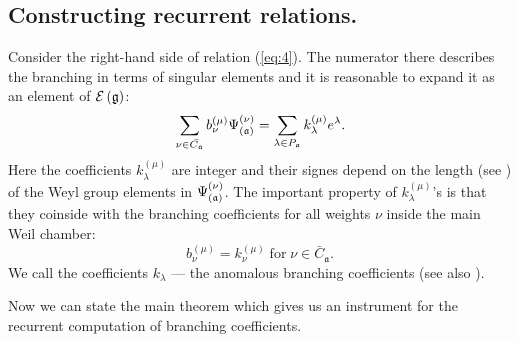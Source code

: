 \documentclass[12pt]{iopart}
\theoremstyle{definition}
\newcommand{\af}{\mathfrak{a}}
\begin{document}
\subsection{Constructing recurrent relations.}
\label{subsec:Construct-recurrent-rel}

Consider the right-hand side of relation (\ref{eq:4}).
The numerator there describes the branching in terms of singular elements and
it is reasonable to expand it as an element of $\mathcal{E}\left( \frak{g} \right)$:
\begin{equation}
  \label{eq:21}
  \sum_{\nu \in \bar{C_{\mathfrak{a}}}}b_{\nu }^{\left( \mu \right) }\Psi _{\left( \frak{%
        a}\right) }^{\left( \nu \right) }=\sum_{\lambda \in P_{\af}}k_{\lambda
  }^{\left( \mu \right) }e^{\lambda }.
\end{equation}
Here the coefficients $k_{\lambda}^{\left( \mu \right) }$ are integer and their signes
depend on the length (see \cite{humphreys1978rth})  of the Weyl group elements in
$\Psi _{\left( \frak{a}\right) }^{\left( \nu \right) }$. The important property of
$k_{\lambda}^{\left( \mu \right) }$'s is that they coinside with the branching coefficients
for all weights $\nu$ inside the main Weil chamber:
\begin{equation}
  b^{(\mu)}_{\nu}=k^{(\mu)}_{\nu} \; \mbox{for} \; \nu\in \bar{C}_{\mathfrak{a}}.
\label{eq:21-1}
\end{equation}
We call the coefficients $k_{\lambda}$ --- the anomalous branching coefficients
(see also \cite{ilyin812pbc}).

Now we can state the main theorem which gives us an instrument for the
recurrent computation of branching coefficients.
\end{document}
